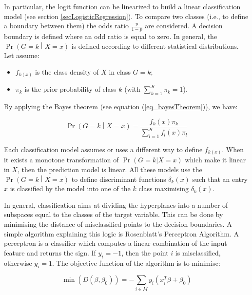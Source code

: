 In particular, the logit function can be linearized to build a linear classification model (see section \ref{secLogisticRegression}). To compare two classes (i.e., to define a boundary between them) the odds ratio $\frac{p}{1-p}$ are considered. A decision boundary is defined where an odd ratio is equal to zero. In general, the $\Pr{\left(G=k\middle| X=x\right)}$ is defined according to different statistical distributions. Let assume:

\begin{itemize}
    \item $f_{k\left(x\right)}$ is the class density of $X$ in class $G=k$;
    \item $\pi_k$ is the prior probability of class $k$ (with $\sum_{k=1}^{K}{\pi_k=1}$).
\end{itemize}

By applying the Bayes theorem (see equation (\ref{eq_bayesTheorem})), we have:

\begin{equation}
        \Pr{\left(G=k\middle| X=x\right)}=\frac{f_k\left(x\right)\pi_k}{\sum_{l=1}^{K}{f_l\left(x\right)\pi_l}}
        \label{eq_classificationModels}
\end{equation}

Each classification model assumes or uses a different way to define $f_{k\left(x\right)}$. When it exists a monotone transformation of $\Pr(G=k|X=x)$ which make it linear in $X$, then the prediction model is linear. All these models use the $\Pr{\left(G=k\middle| X=x\right)}$ to define discriminant functions $\delta_k(x)$ such that an entry $x$ is classified by the model into one of the $k$ class maximising $\delta_k(x)$.\par

In general, classification aims at dividing the hyperplanes into a number of subspaces equal to the classes of the target variable. This can be done by minimising the distance of misclassified points to the decision boundaries. A simple algorithm explaining this logic is Rosenblatt’s Perceptron Algorithm. A perceptron is a classifier which computes a linear combination of the input feature and returns the sign. If $y_i=-1$, then the point $i$ is misclassified, otherwise $y_i=1$. The objective function of the algorithm is to minimise:

\begin{equation}
        \min{(D\left(\beta,\beta_0\right))}=-\sum_{i\in M}{y_i(x_i^T\beta+\beta_0)}
        \label{eq_perceptron1}
\end{equation}

